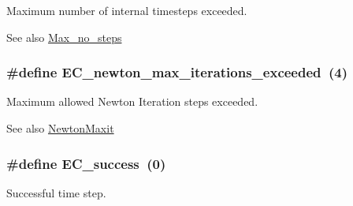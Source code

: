 Maximum number of internal timesteps exceeded. 

\begin{DoxySeeAlso}{See also}
\hyperlink{radau2a_8cu_a4f5652e996f678da1b1b93c8aa4a7961}{Max\+\_\+no\+\_\+steps} 
\end{DoxySeeAlso}
\subsubsection[{\texorpdfstring{E\+C\+\_\+newton\+\_\+max\+\_\+iterations\+\_\+exceeded}{EC_newton_max_iterations_exceeded}}]{\setlength{\rightskip}{0pt plus 5cm}\#define E\+C\+\_\+newton\+\_\+max\+\_\+iterations\+\_\+exceeded~(4)}\hypertarget{group__RKCU__ErrCodes_gaae2906abd9ae8a2791c2e8626ca73a32}{}\label{group__RKCU__ErrCodes_gaae2906abd9ae8a2791c2e8626ca73a32}


Maximum allowed Newton Iteration steps exceeded. 

\begin{DoxySeeAlso}{See also}
\hyperlink{radau2a_8cu_ab408861ee5149b85ac129cb8a3875743}{Newton\+Maxit} 
\end{DoxySeeAlso}
\subsubsection[{\texorpdfstring{E\+C\+\_\+success}{EC_success}}]{\setlength{\rightskip}{0pt plus 5cm}\#define E\+C\+\_\+success~(0)}\hypertarget{group__RKCU__ErrCodes_gabd83bc0f9f475a2189a4db4a08b790ca}{}\label{group__RKCU__ErrCodes_gabd83bc0f9f475a2189a4db4a08b790ca}


Successful time step. 

